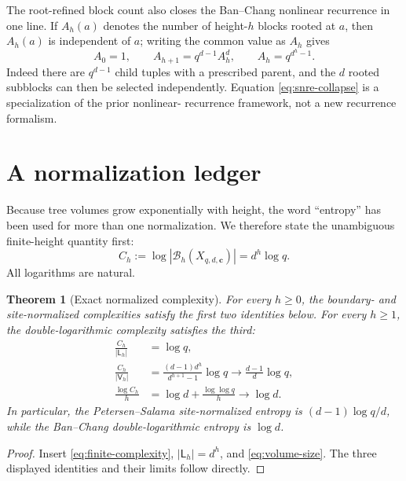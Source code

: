 \documentclass[11pt,a4paper]{amsart}
\newtheorem{theorem}{Theorem}[section]
\theoremstyle{definition}
\theoremstyle{remark}
\newcommand{\cB}{\mathcal B}
\newcommand{\Lev}{\mathsf L}
\newcommand{\Vol}{\mathsf V}
\begin{document}
The root-refined block count also closes the Ban--Chang nonlinear recurrence
in one line.  If $A_h(a)$ denotes the number of height-$h$ blocks rooted at
$a$, then $A_h(a)$ is independent of $a$; writing the common value as $A_h$
gives
\begin{equation}\label{eq:snre-collapse}
 A_0=1,
 \qquad A_{h+1}=q^{d-1}A_h^d,
 \qquad A_h=q^{d^h-1}.
\end{equation}
Indeed there are $q^{d-1}$ child tuples with a prescribed parent, and the
$d$ rooted subblocks can then be selected independently.  Equation
\eqref{eq:snre-collapse} is a specialization of the prior nonlinear-
recurrence framework, not a new recurrence formalism.

\section{A normalization ledger}
\label{sec:complexity}

Because tree volumes grow exponentially with height, the word ``entropy''
has been used for more than one normalization.  We therefore state the
unambiguous finite-height quantity first:
\begin{equation}\label{eq:finite-complexity}
 C_h:=\log|\cB_h(X_{q,d,\boldsymbol c})|=d^h\log q.
\end{equation}
All logarithms are natural.

\begin{theorem}[Exact normalized complexity]\label{thm:complexity}
For every $h\geq0$, the boundary- and site-normalized complexities satisfy
the first two identities below.  For every $h\geq1$, the double-logarithmic
complexity satisfies the third:
\begin{align}
 \frac{C_h}{|\Lev_h|}
   &=\log q,\label{eq:boundary-rate}\\
 \frac{C_h}{|\Vol_h|}
   &=\frac{(d-1)d^h}{d^{h+1}-1}\log q
     \longrightarrow\frac{d-1}{d}\log q,\label{eq:site-rate}\\
 \frac{\log C_h}{h}
   &=\log d+\frac{\log\log q}{h}
     \longrightarrow\log d.\label{eq:double-log-rate}
\end{align}
In particular, the Petersen--Salama site-normalized entropy is
$(d-1)\log q/d$, while the Ban--Chang double-logarithmic entropy is
$\log d$.
\end{theorem}

\begin{proof}
Insert \eqref{eq:finite-complexity}, $|\Lev_h|=d^h$, and
\eqref{eq:volume-size}.  The three displayed identities and their limits
follow directly.
\end{proof}
\end{document}
